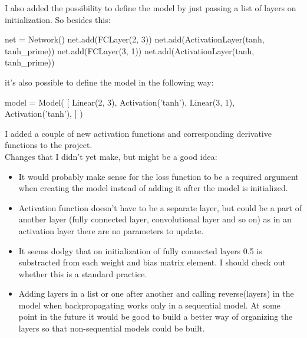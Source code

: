 \documentclass{article}
\begin{document}
I also added the possibility to define the model by just passing a list of layers on initialization. So besides this:
\begin{python}
    net = Network()
    net.add(FCLayer(2, 3))
    net.add(ActivationLayer(tanh, tanh_prime))
    net.add(FCLayer(3, 1))
    net.add(ActivationLayer(tanh, tanh_prime))
\end{python}
\pagebreak
it's also possible to define the model in the following way:
\begin{python}
    model = Model(
        [
            Linear(2, 3),
            Activation('tanh'),
            Linear(3, 1),
            Activation('tanh'),
        ]
    )
\end{python}

I added a couple of new activation functions and corresponding derivative functions to the project. \\

Changes that I didn't yet make, but might be a good idea:
\begin{itemize}
    \item It would probably make sense for the loss function to be a required argument when creating the model instead of adding it after 
    the model is initialized.
    \item Activation function doesn't have to be a separate layer, but could be a part of another layer (fully connected layer, convolutional layer and so on)
    as in an activation layer there are no parameters to update.
    \item It seems dodgy that on initialization of fully connected layers 0.5 is substracted from each weight and bias matrix element. I should check 
    out whether this is a standard practice.
    \item Adding layers in a list or one after another and calling reverse(layers) in the model when backpropagating works only in a sequential model. At some point in the future it would 
    be good to build a better way of organizing the layers so that non-sequential models could be built.
\end{itemize}
\end{document}
